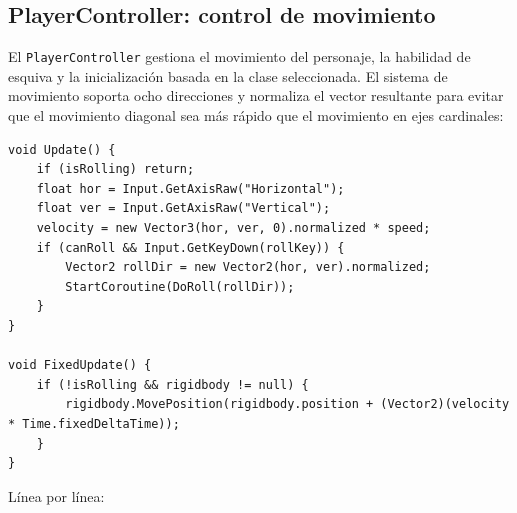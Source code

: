 \subsection{PlayerController: control de movimiento}


El \texttt{PlayerController} gestiona el movimiento del personaje, la habilidad de esquiva y la inicialización basada en la clase seleccionada. El sistema de movimiento soporta ocho direcciones y normaliza el vector resultante para evitar que el movimiento diagonal sea más rápido que el movimiento en ejes cardinales:

\begin{lstlisting}
void Update() {
    if (isRolling) return;
    float hor = Input.GetAxisRaw("Horizontal");
    float ver = Input.GetAxisRaw("Vertical");
    velocity = new Vector3(hor, ver, 0).normalized * speed;
    if (canRoll && Input.GetKeyDown(rollKey)) {
        Vector2 rollDir = new Vector2(hor, ver).normalized;
        StartCoroutine(DoRoll(rollDir));
    }
}

void FixedUpdate() {
    if (!isRolling && rigidbody != null) {
        rigidbody.MovePosition(rigidbody.position + (Vector2)(velocity * Time.fixedDeltaTime));
    }
}
\end{lstlisting}


Línea por línea:


